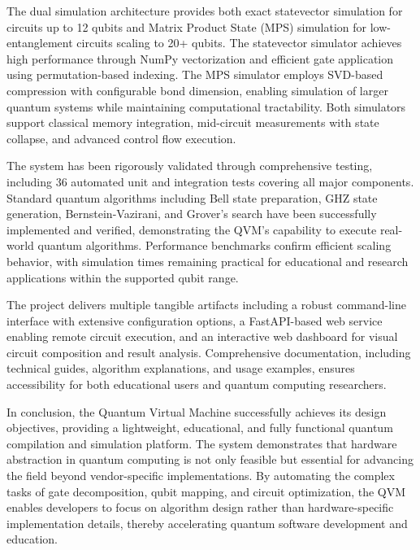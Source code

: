 The dual simulation architecture provides both exact statevector simulation for circuits up to 12 qubits and Matrix Product State (MPS) simulation for low-entanglement circuits scaling to 20+ qubits. The statevector simulator achieves high performance through NumPy vectorization and efficient gate application using permutation-based indexing. The MPS simulator employs SVD-based compression with configurable bond dimension, enabling simulation of larger quantum systems while maintaining computational tractability. Both simulators support classical memory integration, mid-circuit measurements with state collapse, and advanced control flow execution.

The system has been rigorously validated through comprehensive testing, including 36 automated unit and integration tests covering all major components. Standard quantum algorithms including Bell state preparation, GHZ state generation, Bernstein-Vazirani, and Grover's search have been successfully implemented and verified, demonstrating the QVM's capability to execute real-world quantum algorithms. Performance benchmarks confirm efficient scaling behavior, with simulation times remaining practical for educational and research applications within the supported qubit range.

The project delivers multiple tangible artifacts including a robust command-line interface with extensive configuration options, a FastAPI-based web service enabling remote circuit execution, and an interactive web dashboard for visual circuit composition and result analysis. Comprehensive documentation, including technical guides, algorithm explanations, and usage examples, ensures accessibility for both educational users and quantum computing researchers.

In conclusion, the Quantum Virtual Machine successfully achieves its design objectives, providing a lightweight, educational, and fully functional quantum compilation and simulation platform. The system demonstrates that hardware abstraction in quantum computing is not only feasible but essential for advancing the field beyond vendor-specific implementations. By automating the complex tasks of gate decomposition, qubit mapping, and circuit optimization, the QVM enables developers to focus on algorithm design rather than hardware-specific implementation details, thereby accelerating quantum software development and education.


